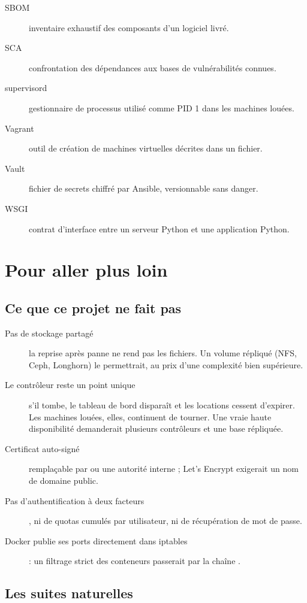 \begin{description}
\item[SBOM] inventaire exhaustif des composants d'un logiciel livré.
\item[SCA] confrontation des dépendances aux bases de vulnérabilités connues.
\item[supervisord] gestionnaire de processus utilisé comme PID 1 dans les
  machines louées.
\item[Vagrant] outil de création de machines virtuelles décrites dans un
  fichier.
\item[Vault] fichier de secrets chiffré par Ansible, versionnable sans danger.
\item[WSGI] contrat d'interface entre un serveur Python et une application
  Python.
\end{description}

\chapter{Pour aller plus loin}

\section{Ce que ce projet ne fait pas}

\begin{description}
\item[Pas de stockage partagé] la reprise après panne ne rend pas les fichiers.
  Un volume répliqué (NFS, Ceph, Longhorn) le permettrait, au prix d'une
  complexité bien supérieure.
\item[Le contrôleur reste un point unique] s'il tombe, le tableau de bord
  disparaît et les locations cessent d'expirer. Les machines louées, elles,
  continuent de tourner. Une vraie haute disponibilité demanderait plusieurs
  contrôleurs et une base répliquée.
\item[Certificat auto-signé] remplaçable par  ou une autorité
  interne ; Let's Encrypt exigerait un nom de domaine public.
\item[Pas d'authentification à deux facteurs], ni de quotas cumulés par
  utilisateur, ni de récupération de mot de passe.
\item[Docker publie ses ports directement dans iptables] : un filtrage strict
  des conteneurs passerait par la chaîne .
\end{description}

\section{Les suites naturelles}


